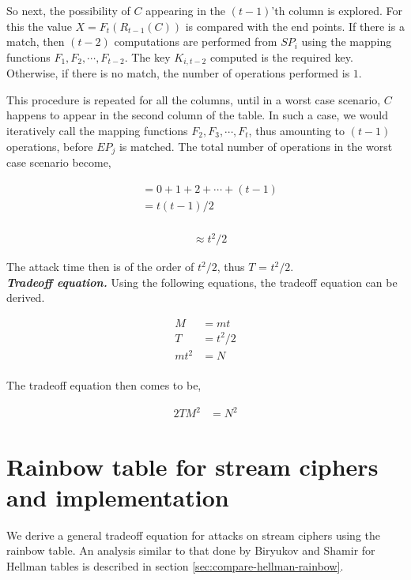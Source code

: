 So next, the possibility of $C$ appearing in the $(t-1)$'th column is explored. For this the value $X = F_{t}(R_{t-1}(C))$ is compared with the end points. If there is a match, then $(t-2)$ computations are performed from $SP_{i}$ using the mapping functions $F_1, F_2, \cdots, F_{t-2}$. The key $K_{i,t-2}$ computed is the required key. Otherwise, if there is no match, the number of operations performed is $1$.

This procedure is repeated for all the columns, until in a worst case scenario, $C$ happens to appear in the second column of the table. In such a case, we would iteratively call the mapping functions $F_2, F_3, \cdots, F_t$, thus amounting to $(t-1)$ operations, before $EP_j$ is matched. The total number of operations in the worst case scenario become, 

\begin{align*}
&= 0 + 1 + 2 + \cdots + (t-1)\\
&= t(t-1)/2\\
\end{align*}

\begin{align}
\label{eq:time-rainbow-single-prefix} &\approx t^2/2
\end{align}

The attack time then is of the order of $t^2/2$, thus $T$ = $t^2/2$.\\


\noindent \textit{\textbf{Tradeoff equation.}} Using the following equations, the tradeoff equation can be derived. 

\begin{align*}
M &= mt\\
T &= t^2/2\\
mt^2 &= N\\
\end{align*}

The tradeoff equation then comes to be,

\begin{align}
\label{eq:tmdto-rainbow-block} 2TM^2 &= N^2
\end{align}


\section{Rainbow table for stream ciphers and implementation}
\label{sec:rainbow-stream}

We derive a general tradeoff equation for attacks on stream ciphers using the rainbow table. An analysis similar to that done by Biryukov and Shamir for Hellman tables is described in section \ref{sec:compare-hellman-rainbow}. 

